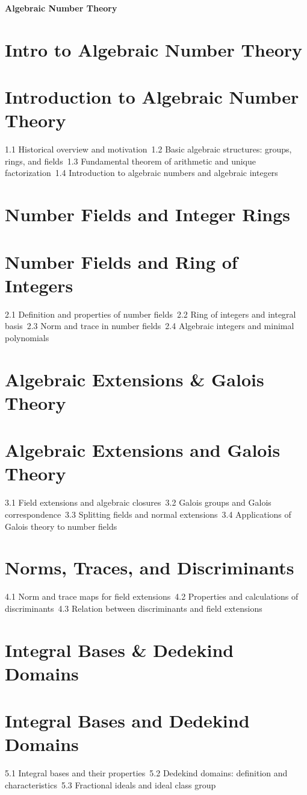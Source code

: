 {\LARGE \bf{Algebraic Number Theory}}
\section{Intro to Algebraic Number Theory}
\section{Introduction to Algebraic Number Theory}
1.1 Historical overview and motivation\
1.2 Basic algebraic structures: groups, rings, and fields\
1.3 Fundamental theorem of arithmetic and unique factorization\
1.4 Introduction to algebraic numbers and algebraic integers\
\section{Number Fields and Integer Rings}
\section{Number Fields and Ring of Integers}
2.1 Definition and properties of number fields\
2.2 Ring of integers and integral basis\
2.3 Norm and trace in number fields\
2.4 Algebraic integers and minimal polynomials\
\section{Algebraic Extensions \& Galois Theory}
\section{Algebraic Extensions and Galois Theory}
3.1 Field extensions and algebraic closures\
3.2 Galois groups and Galois correspondence\
3.3 Splitting fields and normal extensions\
3.4 Applications of Galois theory to number fields\
\section{Norms, Traces, and Discriminants}
4.1 Norm and trace maps for field extensions\
4.2 Properties and calculations of discriminants\
4.3 Relation between discriminants and field extensions\
\section{Integral Bases \& Dedekind Domains}
\section{Integral Bases and Dedekind Domains}
5.1 Integral bases and their properties\
5.2 Dedekind domains: definition and characteristics\
5.3 Fractional ideals and ideal class group\
